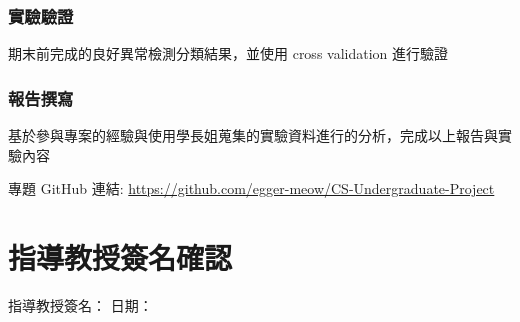 \documentclass[12pt,a4paper]{article}
\begin{document}
\subsubsection{實驗驗證}
期末前完成的良好異常檢測分類結果，並使用 cross validation 進行驗證

\subsubsection{報告撰寫}
基於參與專案的經驗與使用學長姐蒐集的實驗資料進行的分析，完成以上報告與實驗內容

\vspace{2cm}

\noindent 專題 GitHub 連結: \url{https://github.com/egger-meow/CS-Undergraduate-Project}

\vspace{3cm}

\section*{指導教授簽名確認}

\vspace{3cm}

\noindent 指導教授簽名：\underline{\hspace{5cm}} \hspace{2cm} 日期：\underline{\hspace{3cm}}
\end{document}

